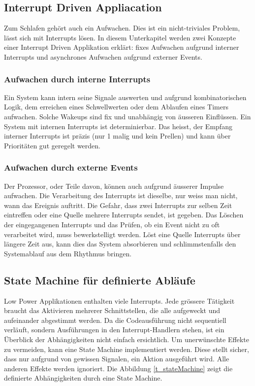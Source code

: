 \subsection{Interrupt Driven Appliacation}\label{pm_interrupt} 
Zum Schlafen gehört auch ein Aufwachen. Dies ist ein nicht-triviales Problem, lässt sich mit Interrupts lösen. In diesem Unterkapitel werden zwei Konzepte einer Interrupt Driven Applikation erklärt: fixes Aufwachen aufgrund interner Interrupts und asynchrones Aufwachen aufgrund externer Events.

\subsubsection{Aufwachen durch interne Interrupts}
Ein System kann intern seine Signale auswerten und aufgrund kombinatorischen Logik, dem erreichen eines Schwellwerten oder dem Ablaufen eines Timers aufwachen. Solche Wakeups sind fix und unabhängig von äusseren Einflüssen. Ein System mit internen Interrupts ist determinierbar. Das heisst, der Empfang interner Interrupts ist präzis (nur 1 malig und kein Prellen) und kann über Prioritäten gut geregelt werden.

\subsubsection{Aufwachen durch externe Events}
Der Prozessor, oder Teile davon, können auch aufgrund äusserer Impulse aufwachen. Die Verarbeitung des Interrupts ist dieselbe, nur weiss man nicht, wann das Ereignis auftritt. Die Gefahr, dass zwei Interrupts zur selben Zeit eintreffen oder eine Quelle mehrere Interrupts sendet, ist gegeben. Das Löschen der eingegangenen Interrupts und das Prüfen, ob ein Event nicht zu oft verarbeitet wird, muss bewerkstelligt werden. Löst eine Quelle Interrupts über längere Zeit aus, kann dies das System absorbieren und schlimmstenfalls den Systemablauf aus dem Rhythmus bringen.

\subsection{State Machine für definierte Abläufe}\label{pm_state_machine} 
Low Power Applikationen enthalten viele Interrupts. Jede grössere Tätigkeit braucht das Aktivieren mehrerer Schnittstellen, die alle aufgeweckt und aufeinander abgestimmt werden. Da die Codeausführung nicht sequentiell verläuft, sondern Ausführungen in den Interrupt-Handlern stehen, ist ein Überblick der Abhängigkeiten nicht einfach ersichtlich. Um unerwünschte Effekte zu vermeiden, kann eine State Machine implementiert werden. Diese stellt sicher, dass nur aufgrund von gewissen Signalen, ein Aktion ausgeführt wird. Alle anderen Effekte werden ignoriert. Die Abbildung \ref{t_stateMachine} zeigt die definierte Abhängigkeiten durch eine State Machine.

